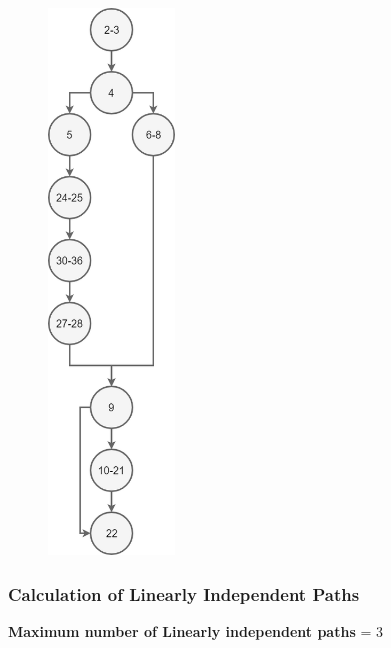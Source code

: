 \documentclass{scrreprt}
\begin{document}
\begin{figure}[H]
\centering
\includegraphics[width=0.3\textwidth, keepaspectratio]{addImages.png}
\end{figure}


\newpage


\subsubsection{Calculation of Linearly Independent Paths}
\textbf{Maximum number of Linearly independent paths} = 3
\end{document}
